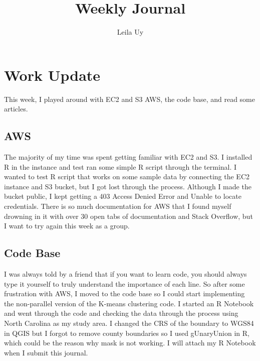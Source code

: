 \documentclass[a4paper,10pt]{article}
\title{Weekly Journal}
\author{Leila Uy}
\begin{document}
\maketitle

\section{Work Update}
This week, I played around with EC2 and S3 AWS, the code base, and read some articles. 
\cite{carruthers2003invasive, wang2019potential, peng2017economic}

\subsection{AWS}
The majority of my time was spent getting familiar with EC2 and S3. I installed R in the instance and test ran some  
simple R script through the terminal. I wanted to test R script that works on some sample data by connecting the EC2 
instance and S3 bucket, but I got lost through the process. Although I made the bucket public, I kept getting a 403 
Access Denied Error and Unable to locate credentials. There is so much documentation for AWS that I found myself 
drowning in it with over 30 open tabs of documentation and Stack Overflow, but I want to try again this week as 
a group.

\subsection{Code Base}
I was always told by a friend that if you want to learn code, you should always type it yourself to truly understand 
the importance of each line. So after some frustration with AWS, I moved to the code base so I could start implementing 
the non-parallel version of the K-means clustering code. I started an R Notebook and went through the code and checking 
the data through the process using North Carolina as my study area. I changed the CRS of the boundary to WGS84 in 
QGIS but I forgot to remove county boundaries so I used gUnaryUnion in R, which could be the reason why mask is not 
working. I will attach my R Notebook when I submit this journal.
\end{document}
